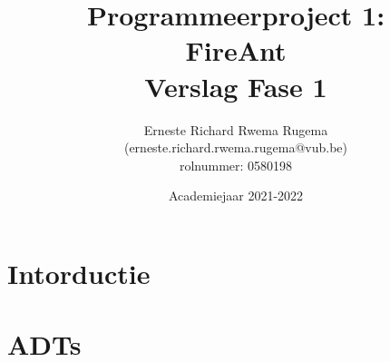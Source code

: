 \documentclass[11pt]{report}
\title{{Programmeerproject 1:}\\
				{FireAnt}\\
				{\large Verslag Fase 1}}
\author{{Erneste Richard Rwema Rugema}\\
    {(erneste.richard.rwema.rugema@vub.be)}\\
			{\leftmark rolnummer: 0580198}}
\date{Academiejaar 2021-2022}
\begin{document}
\maketitle

\tableofcontents
\newpage

\chapter{Intorductie}


\chapter{ADTs}

\end{document}
